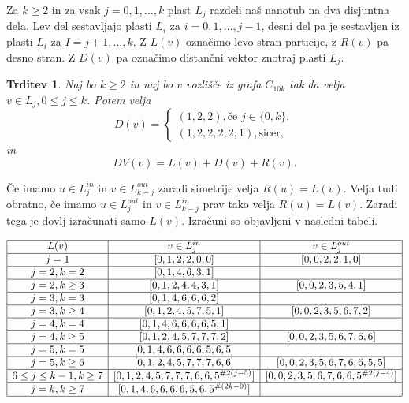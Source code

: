 \documentclass[a4paper, 12pt]{article}
\newtheorem{trditev}{Trditev}[section]
\begin{document}
Za $k \geq 2$ in za vsak $j=0,1, \dots , k$ plast $L_j$ razdeli naš nanotub na dva disjuntna dela. Lev del sestavljajo plasti $L_i$ za $i = 0,1,\dots , j-1$, desni
 del pa je sestavljen iz plasti $L_i$ za $I = j+1, \dots, k$. Z $L(v)$ označimo levo stran particije, z $R(v)$ pa desno stran. Z $D(v)$ pa označimo distančni vektor znotraj plasti $L_j$.

\begin{trditev}
    Naj bo $k \geq 2$ in naj bo $v$ vozlišče iz grafa $C_{10k}$ tak da velja $v \in L_j, 0 \leq j \leq k$. Potem velja
    $$
    D(v) = \begin{cases}
            (1,2,2), \text{če } j \in \{0, k \}, \\
            (1,2,2,2,2,1), \text{sicer}, 
            \end{cases}
    $$
    in 
    $$
            DV(v) = L(v) + D(v) + R(v).
    $$

\end{trditev}

Če imamo $u \in L_j^{in}$ in $v \in L_{k-j}^{out}$ zaradi simetrije velja $R(u) = L(v)$. Velja tudi obratno, če imamo $u \in L_j^{out}$ in 
$v \in L_{k-j}^{in}$ prav tako velja $R(u) = L(v)$. Zaradi tega je dovlj izračunati samo $L(v)$. Izračuni so objavljeni v nasledni tabeli.

$\begin{array}{ |c|c|c| }
    \hline
    L(v) & v \in L_j^{in} & v \in L_j^{out}  \\
    \hline
    j = 1 & [0, 1, 2, 2, 0, 0] & [0, 0, 2, 2, 1, 0] \\
    \hline
    j = 2, k = 2 & [0, 1, 4, 6, 3, 1] &  \\
    \hline
    j = 2, k \geq 3 & [0, 1, 2, 4, 4, 3, 1] & [0, 0, 2, 3, 5, 4, 1] \\
    \hline
    j = 3, k = 3 & [0, 1, 4, 6, 6, 6, 2] & \\
    \hline
    j = 3, k \geq 4 & [0, 1, 2, 4, 5, 7, 5, 1] & [0, 0, 2, 3, 5, 6, 7, 2] \\
    \hline
    j = 4, k = 4 & [0, 1, 4, 6, 6, 6, 6, 5, 1] & \\
    \hline
    j = 4, k \geq 5 & [0, 1, 2, 4, 5, 7, 7, 7, 2] & [0, 0, 2, 3, 5, 6, 7, 6, 6] \\
    \hline
    j = 5, k = 5 & [0, 1, 4, 6, 6, 6, 6, 5, 6, 5] & \\
    \hline
    j = 5, k \geq 6 & [0, 1, 2, 4, 5, 7, 7, 7, 6, 6] & [0, 0, 2, 3, 5, 6, 7, 6, 6, 5, 5]\\
    \hline
    6 \leq j \leq k-1, k \geq 7 & [0, 1, 2, 4, 5, 7, 7, 7, 6, 6, 5^{\#2(j-5)}] & [0, 0, 2, 3, 5, 6, 7, 6, 6, 5^{\#2(j-4)}]\\
    \hline
    j = k, k \geq 7 & [0, 1, 4, 6, 6, 6, 6, 5, 6, 5^{\#(2k - 9)}] & \\
    \hline

\end{array}$
\end{document}
